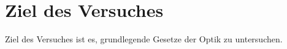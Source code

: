 \section{Ziel des Versuches}
\label{sec:versuchsziel}

Ziel des Versuches ist es, grundlegende Gesetze der Optik zu untersuchen.